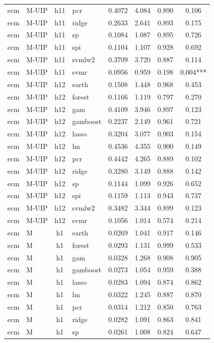 \begin{ThreePartTable}
\begin{longtable}[t]{llclcccc}
ecm & M-UIP & h11 & pcr & 0.4072 & 4.084 & 0.890 & 0.106\\
ecm & M-UIP & h11 & ridge & 0.2633 & 2.641 & 0.893 & 0.175\\
ecm & M-UIP & h11 & sp & 0.1084 & 1.087 & 0.895 & 0.726\\
ecm & M-UIP & h11 & spi & 0.1104 & 1.107 & 0.928 & 0.692\\
ecm & M-UIP & h11 & svmlw2 & 0.3709 & 3.720 & 0.887 & 0.114\\
ecm & M-UIP & h11 & svmr & 0.0956 & 0.959 & 0.198 & 0.004***\\
\addlinespace
ecm & M-UIP & h12 & earth & 0.1508 & 1.448 & 0.968 & 0.453\\
ecm & M-UIP & h12 & forest & 0.1166 & 1.119 & 0.797 & 0.270\\
ecm & M-UIP & h12 & gam & 0.4109 & 3.946 & 0.897 & 0.123\\
ecm & M-UIP & h12 & gamboost & 0.2237 & 2.149 & 0.961 & 0.721\\
ecm & M-UIP & h12 & lasso & 0.3204 & 3.077 & 0.903 & 0.154\\
ecm & M-UIP & h12 & lm & 0.4536 & 4.355 & 0.900 & 0.149\\
ecm & M-UIP & h12 & pcr & 0.4442 & 4.265 & 0.889 & 0.102\\
ecm & M-UIP & h12 & ridge & 0.3280 & 3.149 & 0.888 & 0.142\\
ecm & M-UIP & h12 & sp & 0.1144 & 1.099 & 0.926 & 0.652\\
ecm & M-UIP & h12 & spi & 0.1159 & 1.113 & 0.943 & 0.737\\
ecm & M-UIP & h12 & svmlw2 & 0.3482 & 3.344 & 0.899 & 0.123\\
ecm & M-UIP & h12 & svmr & 0.1056 & 1.014 & 0.574 & 0.214\\
\addlinespace
ecm & M & h1 & earth & 0.0269 & 1.041 & 0.917 & 0.146\\
ecm & M & h1 & forest & 0.0293 & 1.131 & 0.999 & 0.533\\
ecm & M & h1 & gam & 0.0328 & 1.268 & 0.908 & 0.905\\
ecm & M & h1 & gamboost & 0.0273 & 1.054 & 0.959 & 0.388\\
ecm & M & h1 & lasso & 0.0283 & 1.094 & 0.874 & 0.862\\
ecm & M & h1 & lm & 0.0322 & 1.245 & 0.887 & 0.870\\
ecm & M & h1 & pcr & 0.0314 & 1.212 & 0.850 & 0.763\\
ecm & M & h1 & ridge & 0.0282 & 1.091 & 0.863 & 0.841\\
ecm & M & h1 & sp & 0.0261 & 1.008 & 0.824 & 0.647\\

\end{longtable}
\end{ThreePartTable}
